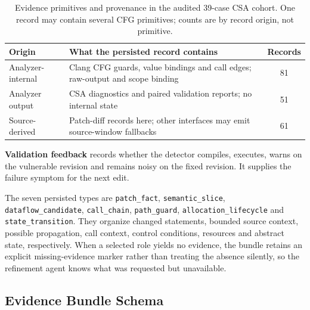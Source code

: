 \begin{table}[!htbp]
\centering
\caption{Evidence primitives and provenance in the audited 39-case CSA cohort. One record may contain several CFG primitives; counts are by record origin, not primitive.}
\label{tab:origin-types}
\begingroup\FTTableSetup
\begin{tabular}{>{\raggedright\arraybackslash}p{}|>{\raggedright\arraybackslash}p{}|c}
\hline\hline
Origin & What the persisted record contains & Records \\
\hline
Analyzer-internal & Clang CFG guards, value bindings and call edges; raw-output and scope binding & 81 \\
Analyzer output & CSA diagnostics and paired validation reports; no internal state & 51 \\
Source-derived & Patch-diff records here; other interfaces may emit source-window fallbacks & 61 \\
\hline\hline
\end{tabular}
\endgroup
\end{table}

\textbf{Validation feedback} records whether the detector compiles, executes, warns on the vulnerable revision and remains noisy on the fixed revision.
It supplies the failure symptom for the next edit.

The seven persisted types are \texttt{patch\_fact}, \texttt{semantic\_slice}, \texttt{dataflow\_candidate}, \texttt{call\_chain}, \texttt{path\_guard}, \texttt{allocation\_lifecycle} and \texttt{state\_transition}.
They organize changed statements, bounded source context, possible propagation, call context, control conditions, resources and abstract state, respectively.
When a selected role yields no evidence, the bundle retains an explicit missing-evidence marker rather than treating the absence silently, so the refinement agent knows what was requested but unavailable.

\subsection{Evidence Bundle Schema}
\label{sec:evidence-schema}

